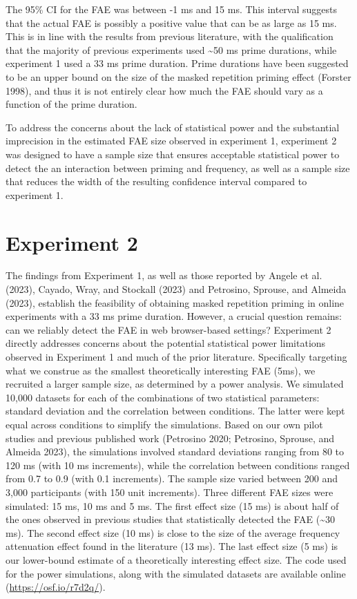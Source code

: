 \documentclass[
]{interact}
\begin{document}
The 95\% CI for the FAE was between -1 ms and 15 ms. This interval
suggests that the actual FAE is possibly a positive value that can be as
large as 15 ms. This is in line with the results from previous
literature, with the qualification that the majority of previous
experiments used \textasciitilde50 ms prime durations, while experiment
1 used a 33 ms prime duration. Prime durations have been suggested to be
an upper bound on the size of the masked repetition priming effect
(Forster 1998), and thus it is not entirely clear how much the FAE
should vary as a function of the prime duration.

To address the concerns about the lack of statistical power and the
substantial imprecision in the estimated FAE size observed in experiment
1, experiment 2 was designed to have a sample size that ensures
acceptable statistical power to detect the an interaction between
priming and frequency, as well as a sample size that reduces the width
of the resulting confidence interval compared to experiment 1.

\section{Experiment 2}\label{experiment-2}

The findings from Experiment 1, as well as those reported by Angele et
al. (2023), Cayado, Wray, and Stockall (2023) and Petrosino, Sprouse,
and Almeida (2023), establish the feasibility of obtaining masked
repetition priming in online experiments with a 33 ms prime duration.
However, a crucial question remains: can we reliably detect the FAE in
web browser-based settings? Experiment 2 directly addresses concerns
about the potential statistical power limitations observed in Experiment
1 and much of the prior literature. Specifically targeting what we
construe as the smallest theoretically interesting FAE (5ms), we
recruited a larger sample size, as determined by a power analysis. We
simulated 10,000 datasets for each of the combinations of two
statistical parameters: standard deviation and the correlation between
conditions. The latter were kept equal across conditions to simplify the
simulations. Based on our own pilot studies and previous published work
(Petrosino 2020; Petrosino, Sprouse, and Almeida 2023), the simulations
involved standard deviations ranging from 80 to 120 ms (with 10 ms
increments), while the correlation between conditions ranged from 0.7 to
0.9 (with 0.1 increments). The sample size varied between 200 and 3,000
participants (with 150 unit increments). Three different FAE sizes were
simulated: 15 ms, 10 ms and 5 ms. The first effect size (15 ms) is about
half of the ones observed in previous studies that statistically
detected the FAE (\textasciitilde30 ms). The second effect size (10 ms)
is close to the size of the average frequency attenuation effect found
in the literature (13 ms). The last effect size (5 ms) is our
lower-bound estimate of a theoretically interesting effect size. The
code used for the power simulations, along with the simulated datasets
are available online (\url{https://osf.io/r7d2q/}).
\end{document}
